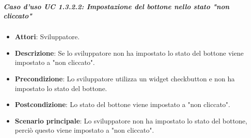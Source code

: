 \subparagraph{Caso d'uso UC 1.3.2.2: Impostazione del bottone nello stato "non cliccato"}
\label{UC 1.3.2.2: Impostazione del bottone nello stato "non cliccato"}

\FloatBarrier
\begin{itemize}
\item\textbf{Attori}: Sviluppatore.
\item\textbf{Descrizione}: Se lo sviluppatore non ha impostato lo stato del bottone viene impostato a "non cliccato".
\item\textbf{Precondizione}: Lo sviluppatore utilizza un widget checkbutton e non ha impostato lo stato del bottone.
\item\textbf{Postcondizione}: Lo stato del bottone viene impostato a "non cliccato".
\item\textbf{Scenario principale}: Lo sviluppatore non ha impostato lo stato del bottone, perciò questo viene impostato a "non cliccato".
\end{itemize}
